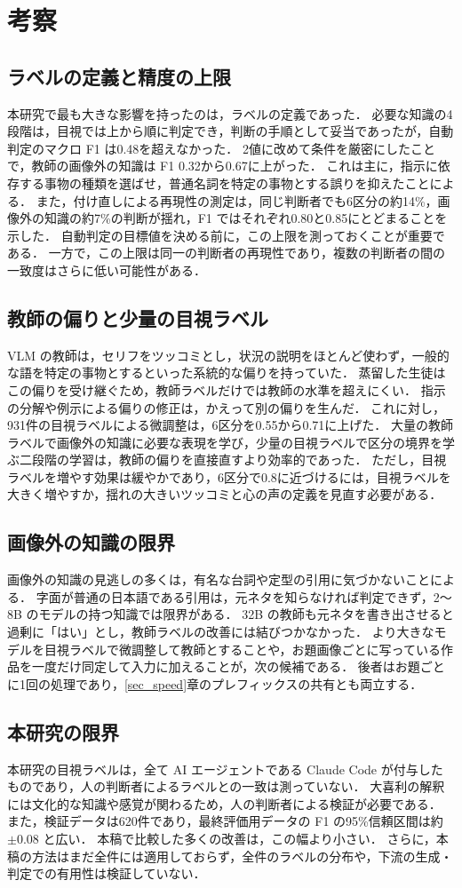 \section{考察}
\label{sec_discussion}
\subsection{ラベルの定義と精度の上限}
本研究で最も大きな影響を持ったのは，ラベルの定義であった．
必要な知識の4段階は，目視では上から順に判定でき，判断の手順として妥当であったが，自動判定のマクロ F1 は0.48を超えなかった．
2値に改めて条件を厳密にしたことで，教師の画像外の知識は F1 0.32から0.67に上がった．
これは主に，指示に依存する事物の種類を選ばせ，普通名詞を特定の事物とする誤りを抑えたことによる．
また，付け直しによる再現性の測定は，同じ判断者でも6区分の約14\%，画像外の知識の約7\%の判断が揺れ，F1 ではそれぞれ0.80と0.85にとどまることを示した．
自動判定の目標値を決める前に，この上限を測っておくことが重要である．
一方で，この上限は同一の判断者の再現性であり，複数の判断者の間の一致度はさらに低い可能性がある．

\subsection{教師の偏りと少量の目視ラベル}
VLM の教師は，セリフをツッコミとし，状況の説明をほとんど使わず，一般的な語を特定の事物とするといった系統的な偏りを持っていた．
蒸留した生徒はこの偏りを受け継ぐため，教師ラベルだけでは教師の水準を超えにくい．
指示の分解や例示による偏りの修正は，かえって別の偏りを生んだ．
これに対し，931件の目視ラベルによる微調整は，6区分を0.55から0.71に上げた．
大量の教師ラベルで画像外の知識に必要な表現を学び，少量の目視ラベルで区分の境界を学ぶ二段階の学習は，教師の偏りを直接直すより効率的であった．
ただし，目視ラベルを増やす効果は緩やかであり，6区分で0.8に近づけるには，目視ラベルを大きく増やすか，揺れの大きいツッコミと心の声の定義を見直す必要がある．

\subsection{画像外の知識の限界}
画像外の知識の見逃しの多くは，有名な台詞や定型の引用に気づかないことによる．
字面が普通の日本語である引用は，元ネタを知らなければ判定できず，2〜8B のモデルの持つ知識では限界がある．
32B の教師も元ネタを書き出させると過剰に「はい」とし，教師ラベルの改善には結びつかなかった．
より大きなモデルを目視ラベルで微調整して教師とすることや，お題画像ごとに写っている作品を一度だけ同定して入力に加えることが，次の候補である．
後者はお題ごとに1回の処理であり，\ref{sec_speed}章のプレフィックスの共有とも両立する．

\subsection{本研究の限界}
本研究の目視ラベルは，全て AI エージェントである Claude Code が付与したものであり，人の判断者によるラベルとの一致は測っていない．
大喜利の解釈には文化的な知識や感覚が関わるため，人の判断者による検証が必要である．
また，検証データは620件であり，最終評価用データの F1 の95\%信頼区間は約 $ \pm 0.08 $ と広い．
本稿で比較した多くの改善は，この幅より小さい．
さらに，本稿の方法はまだ全件には適用しておらず，全件のラベルの分布や，下流の生成・判定での有用性は検証していない．
